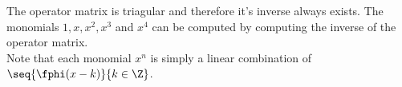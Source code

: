 \begin{example}
\begin{footnotesize}
The operator matrix is triagular and therefore it's inverse 
always exists.
The monomials $1, x, x^2, x^3$ and $x^4$ can be computed by 
computing the inverse of the operator matrix.
\\
Note that each monomial $x^n$ is simply a linear combination 
of $\seq{\fphi(x-k)}{k\in\Z}$.

\end{footnotesize}
\end{example}
